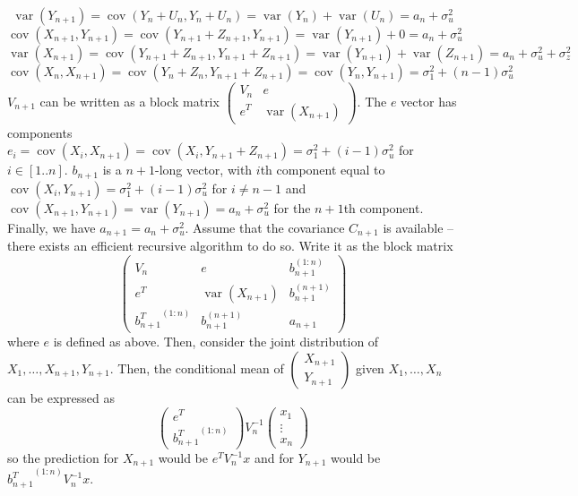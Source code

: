 \documentclass{article}
\newcommand{\openm}{\begin{pmatrix}}
\newcommand{\closem}{\end{pmatrix}}
\DeclareMathOperator{\cov}{cov}
\DeclareMathOperator{\var}{var}
\begin{document}
\[\var(Y_{n+1})=\cov(Y_{n}+U_n, Y_n+U_n)=\var(Y_n)+\var(U_n)=a_n+\sigma_u^2\]
\[\cov(X_{n+1},Y_{n+1})=\cov(Y_{n+1}+Z_{n+1},Y_{n+1})=\var(Y_{n+1})+0=a_n+\sigma_u^2\]
\[\var(X_{n+1})=\cov(Y_{n+1}+Z_{n+1},Y_{n+1}+Z_{n+1})=\var(Y_{n+1})+\var(Z_{n+1})=a_n+\sigma_u^2+\sigma_z^2\]
\[\cov(X_n, X_{n+1})=\cov(Y_n+Z_n,Y_{n+1}+Z_{n+1})=\cov(Y_n,Y_{n+1})=\sigma_1^2+(n-1)\sigma_u^2\]
$V_{n+1}$ can be written as a block matrix $\openm V_n&e\\e^T&\var(X_{n+1})\closem$. The $e$ vector has components $e_i=\cov(X_i,X_{n+1})=\cov(X_i,Y_{n+1}+Z_{n+1})=\sigma_1^2+(i-1)\sigma_u^2$ for $i\in[1..n]$. $b_{n+1}$ is a $n+1$-long vector, with $i$th component equal to $\cov(X_i, Y_{n+1})=\sigma_1^2+(i-1)\sigma_u^2$ for $i\neq n-1$ and $\cov(X_{n+1},Y_{n+1})=\var(Y_{n+1})=a_n+\sigma_u^2$ for the $n+1$th component. Finally, we have $a_{n+1}=a_n+\sigma_u^2$. 
Assume that the covariance $C_{n+1}$ is available -- there exists an efficient recursive algorithm to do so. Write it as the block matrix
\[\openm V_n&e&b_{n+1}^{(1:n)}\\e^T&\var(X_{n+1})&b_{n+1}^{(n+1)}\\{b_{n+1}^T}^{(1:n)}&b_{n+1}^{(n+1)}&a_{n+1}\closem\]
where $e$ is defined as above. Then, consider the joint distribution of $X_1,\ldots,X_{n+1},Y_{n+1}$. Then, the conditional mean of $\openm X_{n+1}\\Y_{n+1}\closem$ given $X_1,\ldots,X_n$ can be expressed as
\[\openm e^T\\{b_{n+1}^T}^{(1:n)}\closem V_n^{-1}\openm x_1\\\vdots\\x_n\closem\]
so the prediction for $X_{n+1}$ would be $e^TV_n^{-1}x$ and for $Y_{n+1}$ would be ${b_{n+1}^T}^{(1:n)}V_n^{-1}x$.
\end{document}
